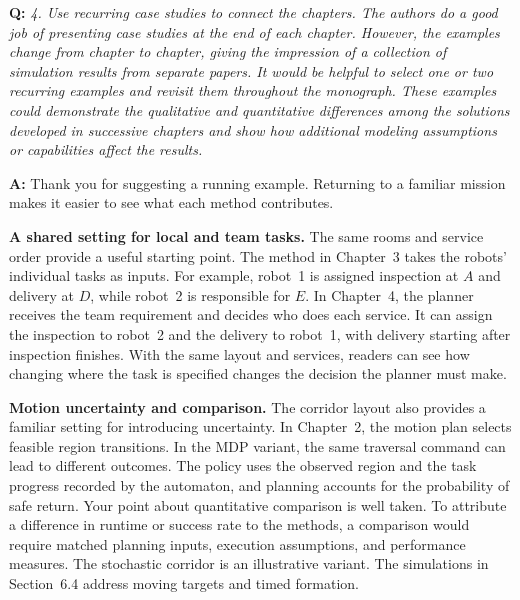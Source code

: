 \documentclass[11pt]{article}
\begin{document}
\begin{shaded*}
\noindent\textbf{Q:} \emph{4. Use recurring case studies to connect the
chapters. The authors do a good job of presenting case studies at the end of each chapter.
However, the examples change from chapter to chapter, giving the impression of a
collection of simulation results from separate papers. It would be helpful to select one
or two recurring examples and revisit them throughout the monograph. These examples could
demonstrate the qualitative and quantitative differences among the solutions developed in
successive chapters and show how additional modeling assumptions or capabilities affect
the results.}
\end{shaded*}
\noindent\textbf{A:} Thank you for suggesting a running example. Returning to a familiar
mission makes it easier to see what each method contributes.

\textbf{A shared setting for local and team tasks.} The same rooms and service order
provide a useful starting point. The method in Chapter~3 takes the robots' individual
tasks as inputs. For example, robot~1 is assigned inspection at $A$ and delivery at
$D$, while robot~2 is responsible for $E$. In Chapter~4, the planner
receives the team requirement and decides who does each service. It can assign the
inspection to robot~2 and the delivery to robot~1, with delivery starting after
inspection finishes.
With the same layout and services, readers can see how changing where the task
is specified changes the decision the planner must make.

\textbf{Motion uncertainty and comparison.} The corridor layout also provides a familiar
setting for introducing uncertainty. In Chapter~2, the motion plan selects feasible region
transitions. In the MDP variant, the same traversal command can lead to different
outcomes. The policy uses the observed region and the task progress recorded by
the automaton, and planning accounts for the probability of safe return.
Your point about quantitative comparison
is well taken. To attribute a difference in runtime or success rate to the methods,
a comparison would require matched planning inputs, execution assumptions,
and performance measures. The stochastic corridor is an illustrative variant.
The simulations in Section~6.4 address moving targets and timed formation.
\end{document}
